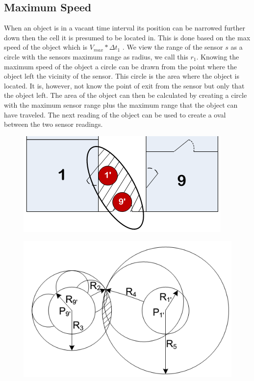 \subsection{Maximum Speed}
\label{sec:speed}
When an object is in a vacant time interval its position can be narrowed further down then the cell it is presumed to be located in. 
This is done based on the max speed of the object which is $V_{max}*\Delta t_1$ . 
We view the range of the sensor $s$ as a circle with the sensors maximum range as radius, we call this $r_1$. 
Knowing the maximum speed of the object a circle can be drawn from the point where the object left the vicinity of the sensor.
This circle is the area where the object is located. 
It is, however, not know the point of exit from the sensor but only that the object left. 
The area of the object can then be calculated by creating a circle with the maximum sensor range plus the maximum range that the object can have traveled. 
The next reading of the object can be used to create a oval between the two sensor readings.  

\begin{figure}%
\includegraphics[width=\columnwidth]{images/speed2.png}%
\caption{}%
\label{}%
\end{figure}




\begin{figure}%
\includegraphics[width=\columnwidth]{images/speed.png}%
\caption{}%
\label{}%
\end{figure}
